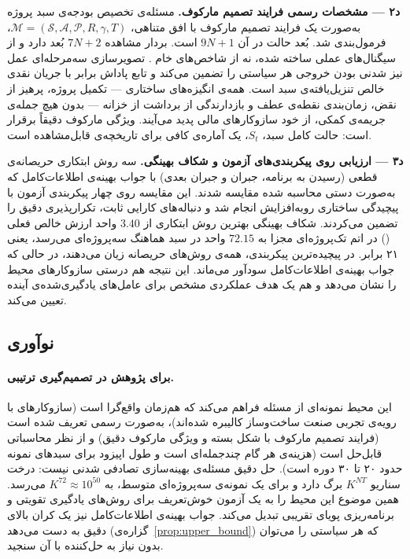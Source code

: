 \textbf{د۲ — مشخصات رسمی فرایند تصمیم مارکوف.}
مسئله‌ی تخصیص بودجه‌ی سبد پروژه به‌صورت یک فرایند تصمیم مارکوف
با افق متناهی، $\mathcal{M} = (\mathcal{S}, \mathcal{A},
\mathcal{P}, R, \gamma, T)$، فرمول‌بندی شد. بُعد حالت در آن
$9N + 1$ است. بردار مشاهده $7N + 2$ بُعد دارد و از سیگنال‌های
عملی ساخته شده، نه از شاخص‌های خام . تصویرسازی سه‌مرحله‌ای
عمل نیز شدنی بودن خروجی هر سیاستی را تضمین می‌کند و تابع پاداش
برابر با جریان نقدی خالص تنزیل‌یافته‌ی سبد است. همه‌ی انگیزه‌های
ساختاری — تکمیل پروژه، پرهیز از نقض، زمان‌بندی نقطه‌ی عطف و
بازدارندگی از برداشت از خزانه — بدون هیچ جمله‌ی جریمه‌ی کمکی، از
خود سازوکارهای مالی پدید می‌آیند. ویژگی مارکوف دقیقاً برقرار است:
حالت کامل سبد، $S_t$، یک آماره‌ی کافی برای تاریخچه‌ی قابل‌مشاهده
است.

\textbf{د۳ — ارزیابی روی پیکربندی‌های آزمون و شکاف بهینگی.}
سه روش ابتکاری حریصانه‌ی قطعی (رسیدن به برنامه، جبران 
و جبران  بعدی) با جواب بهینه‌ی اطلاعات‌کامل که به‌صورت دستی
محاسبه شده مقایسه شدند. این مقایسه روی چهار پیکربندی آزمون با
پیچیدگی ساختاری رو‌به‌افزایش انجام شد و دنباله‌های کارایی ثابت،
تکرارپذیری دقیق را تضمین می‌کردند. شکاف بهینگی بهترین روش
ابتکاری از $3.40$ واحد ارزش خالص فعلی () در اتم تک‌پروژه‌ای
مجزا به $72.15$ واحد در سبد هماهنگ سه‌پروژه‌ای می‌رسد، یعنی ۲۱
برابر. در پیچیده‌ترین پیکربندی، همه‌ی روش‌های حریصانه زیان
می‌دهند، در حالی که جواب بهینه‌ی اطلاعات‌کامل سودآور می‌ماند. این
نتیجه هم درستی سازوکارهای محیط را نشان می‌دهد و هم یک هدف عملکردی
مشخص برای عامل‌های یادگیری‌شده‌ی آینده تعیین می‌کند.

\subsection{نوآوری}
\label{subsec:implications}

\paragraph{برای پژوهش در تصمیم‌گیری ترتیبی.}
این محیط نمونه‌ای از مسئله فراهم می‌کند که هم‌زمان واقع‌گرا است
(سازوکارهای  با رویه‌ی تجربی صنعت ساخت‌وساز کالیبره شده‌اند)،
به‌صورت رسمی تعریف شده است (فرایند تصمیم مارکوف با شکل بسته و
ویژگی مارکوف دقیق) و از نظر محاسباتی قابل‌حل است (هزینه‌ی هر گام
چندجمله‌ای است و طول اپیزود برای سبدهای نمونه حدود ۲۰ تا ۳۰ دوره
است). حل دقیق مسئله‌ی بهینه‌سازی تصادفی شدنی نیست: درخت سناریو
$K^{NT}$ برگ دارد و برای یک نمونه‌ی سه‌پروژه‌ای متوسط، به
$K^{72} \approx 10^{50}$ می‌رسد. همین موضوع این محیط را به یک
آزمون خوش‌تعریف برای روش‌های یادگیری تقویتی و برنامه‌ریزی پویای
تقریبی تبدیل می‌کند. جواب بهینه‌ی اطلاعات‌کامل نیز یک کران بالای
دقیق به دست می‌دهد (گزاره‌ی~\ref{prop:upper_bound}) که هر سیاستی را
می‌توان بدون نیاز به حل‌کننده با آن سنجید.

